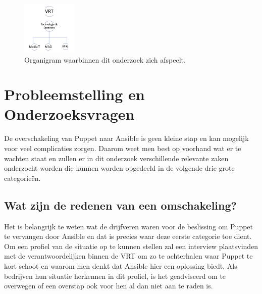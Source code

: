 \begin{figure}
  \begin{center}
\includegraphics[width=100px]{img/organigram}
\end{center}  \caption{Organigram waarbinnen dit onderzoek zich afspeelt.}
  \label{fig:organigram}
\end{figure}







\section{Probleemstelling en Onderzoeksvragen}
\label{sec:onderzoeksvragen}




De overschakeling van Puppet naar Ansible is geen kleine stap en kan mogelijk voor veel complicaties zorgen. Daarom weet men best op voorhand wat er te wachten staat en zullen er in dit onderzoek verschillende relevante zaken onderzocht worden die kunnen worden opgedeeld in de volgende drie grote categorie\"en. 


\subsection{Wat zijn de redenen van een omschakeling?}

Het is belangrijk te weten wat de drijfveren waren voor de beslissing om Puppet te vervangen door Ansible en dat is precies waar deze eerste categorie toe dient. Om een profiel van de situatie op te kunnen stellen zal een interview plaatsvinden met de verantwoordelijken binnen de VRT om zo te achterhalen waar Puppet te kort schoot en waarom men denkt dat Ansible hier een oplossing biedt. Als bedrijven hun situatie herkennen in dit profiel, is het geadviseerd om te overwegen of een overstap ook voor hen al dan niet aan te raden is.

